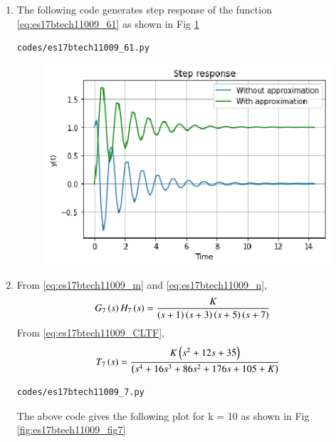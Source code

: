 \begin{enumerate}[label=\thesection.\arabic*.,ref=\thesection.\theenumi]
 \item
The following code generates step response of the function \eqref{eq:es17btech11009_61} as shown in Fig \ref{fig:es17btech11009_fig61}
\begin{lstlisting}
codes/es17btech11009_61.py
\end{lstlisting}
\begin{figure}[!h]
\centering
\includegraphics[width=\columnwidth]{./figs/es17btech11009_61.eps}
\caption{}
\label{fig:es17btech11009_fig61}
\end{figure}

\item
From \eqref{eq:es17btech11009_m} and \eqref{eq:es17btech11009_n},
\begin{align}
G_{7}\brak{s}H_{7}\brak{s}&= \frac{K}{\brak{s+1}\brak{s+3}\brak{s+5}\brak{s+7}}
\label{eq:es17btech11009_gg}
\end{align}
\solution
From \eqref{eq:es17btech11009_CLTF},
\begin{align}
T_{7}\brak{s} = \frac{K\brak{s^2 + 12s +35}}{\brak{s^4 + 16s^3 + 86s^2 + 176s + 105+K}}
\label{eq:es17btech11009_71}
 \end{align}

\begin{lstlisting}
codes/es17btech11009_7.py
\end{lstlisting}

The above code gives the following plot for k = 10 as shown in Fig \ref{fig:es17btech11009_fig7}


\end{enumerate}
